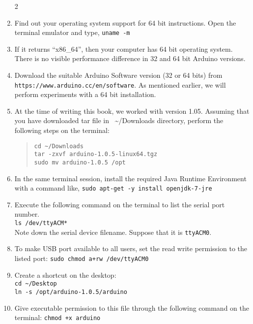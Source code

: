 \begin{enumerate}
      \setcounter{enumi}2
      \item Find out your operating system support for 64 bit
            instructions. Open the terminal emulator and type, {\tt uname -m}
      \item If it returns ``x86\_64'', then your computer has 64 bit
            operating system.   There is no visible performance difference in 32
            and 64 bit Arduino versions.
      \item Download the suitable Arduino Software version (32 or 64 bits)
            from \\ {\tt https://www.arduino.cc/en/software}.  As mentioned
            earlier, we
            will perform experiments with a 64 bit installation.
            
      \item At the time of writing this book, we worked with version 1.05.
            Assuming that you have downloaded tar file in~
            {\large \textasciitilde}/Downloads directory, perform the following
            steps on the terminal:
            \begin{quote}
                  {\tt cd {\large\textasciitilde}/Downloads\\
                        tar -zxvf arduino-1.0.5-linux64.tgz\\
                        sudo mv arduino-1.0.5 /opt}
            \end{quote}
            
      \item In the same terminal session, install the required Java Runtime
            Environment with a command like,
            {\tt sudo apt-get -y install openjdk-7-jre}
            
      \item Execute the
            following command on the terminal to list the serial port number.\\
            {\tt ls /dev/ttyACM*}\\
            Note down the serial device filename.  Suppose that it
            is {\tt ttyACM0}.
      \item To make USB port available to all users, set the read write
            permission to the listed port:
            {\tt sudo chmod a+rw /dev/ttyACM0}
            
      \item Create a shortcut on the desktop:\\
            {\tt cd {\large \textasciitilde}/Desktop\\
            ln -s /opt/arduino-1.0.5/arduino}
      \item Give executable permission to this file through the following
            command on the terminal: {\tt chmod +x arduino}
            

\end{enumerate}
